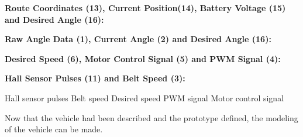 \textbf{Route Coordinates (13), Current Position(14), Battery Voltage (15)\\ and Desired Angle (16):}


\textbf{Raw Angle Data (1), Current Angle (2) and Desired Angle (16):}



\textbf{Desired Speed (6), Motor Control Signal (5) and PWM Signal (4):}



\textbf{Hall Sensor Pulses (11) and Belt Speed (3):}















Hall sensor pulses
Belt speed
Desired speed
PWM signal
Motor control signal








%
%

Now that the vehicle had been described and the prototype defined, the modeling of the vehicle can be made.


